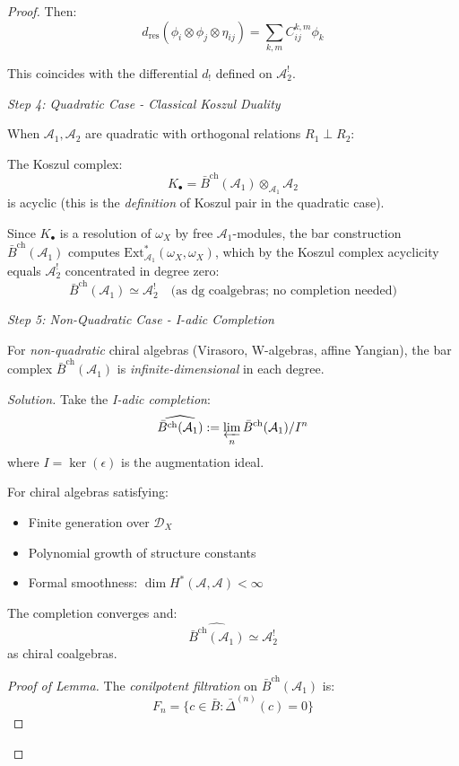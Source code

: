 \begin{proof}
Then:
\[d_{\text{res}}(\phi_i \otimes \phi_j \otimes \eta_{ij}) = \sum_{k,m} C_{ij}^{k,m} \phi_k\]

This coincides with the differential $d_!$ defined on $\mathcal{A}_2^!$.

\medskip
\noindent\emph{Step 4: Quadratic Case - Classical Koszul Duality}

When $\mathcal{A}_1, \mathcal{A}_2$ are quadratic with orthogonal relations $R_1 \perp R_2$:

The Koszul complex:
\[K_\bullet = \bar{B}^{\text{ch}}(\mathcal{A}_1) \otimes_{\mathcal{A}_1} \mathcal{A}_2\]
is acyclic (this is the \emph{definition} of Koszul pair in the quadratic case).

Since $K_\bullet$ is a resolution of $\omega_X$ by free $\mathcal{A}_1$-modules, the
bar construction $\bar{B}^{\mathrm{ch}}(\mathcal{A}_1)$ computes $\mathrm{Ext}^*_{\mathcal{A}_1}(\omega_X, \omega_X)$, which by the Koszul complex acyclicity equals $\mathcal{A}_2^!$ concentrated in degree zero:
\[\bar{B}^{\text{ch}}(\mathcal{A}_1) \simeq \mathcal{A}_2^! \quad \text{(as dg coalgebras; no completion needed)}\]

\medskip
\noindent\emph{Step 5: Non-Quadratic Case - I-adic Completion}

For \emph{non-quadratic} chiral algebras (Virasoro, W-algebras, affine Yangian), the bar complex $\bar{B}^{\text{ch}}(\mathcal{A}_1)$ is \emph{infinite-dimensional} in each degree.

\emph{Solution.} Take the \emph{I-adic completion}:
\[\widehat{\bar{B}^{\text{ch}}(\mathcal{A}_1)} := \varprojlim_n \bar{B}^{\text{ch}}(\mathcal{A}_1)/I^n\]
where $I = \ker(\epsilon)$ is the augmentation ideal.

\begin{lemma}\label{lem:completion-convergence}
For chiral algebras satisfying:
\begin{itemize}
\item Finite generation over $\mathcal{D}_X$
\item Polynomial growth of structure constants
\item Formal smoothness: $\dim H^*(\mathcal{A}, \mathcal{A}) < \infty$
\end{itemize}

The completion converges and:
\[\widehat{\bar{B}^{\text{ch}}(\mathcal{A}_1)} \simeq \mathcal{A}_2^!\]
as chiral coalgebras.
\end{lemma}

\begin{proof}[Proof of Lemma]
The \emph{conilpotent filtration} on $\bar{B}^{\text{ch}}(\mathcal{A}_1)$ is:
\[F_n = \{c \in \bar{B} : \bar{\Delta}^{(n)}(c) = 0\}\]


\end{proof}
\end{proof}
